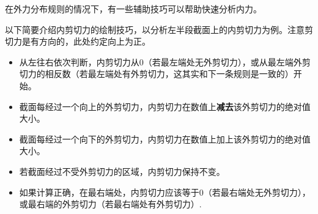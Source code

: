 在外力分布规则的情况下，有一些辅助技巧可以帮助快速分析内力。

以下简要介绍内剪切力的绘制技巧，以分析左半段截面上的内剪切力为例。注意剪切力是有方向的，此处约定向上为正。
\begin{itemize}
\item 从左往右依次判断，内剪切力从$0$（若最左端处无外剪切力），或从最左端外剪切力的相反数（若最左端处有外剪切力，这其实和下一条规则是一致的）开始。
\item 截面每经过一个向上的外剪切力，内剪切力在数值上\textbf{减去}该外剪切力的绝对值大小。
\item 截面每经过一个向下的外剪切力，内剪切力在数值上加上该外剪切力的绝对值大小。
\item 若截面经过不受外剪切力的区域，内剪切力保持不变。
\item 如果计算正确，在最右端处，内剪切力应该等于$0$（若最右端处无外剪切力），或最右端的外剪切力（若最右端处有外剪切力）.
\end{itemize}
